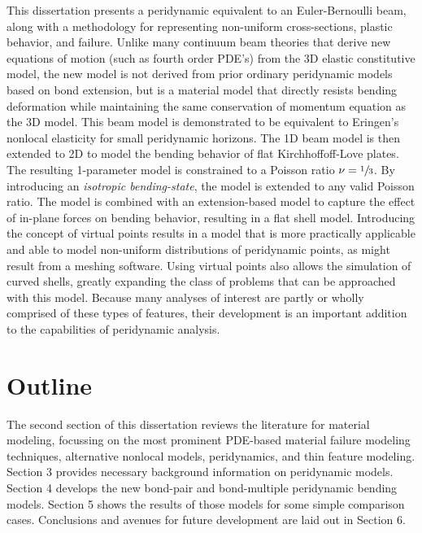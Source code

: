 This dissertation presents a peridynamic equivalent to an Euler-Bernoulli beam, along with a methodology for representing non-uniform cross-sections, plastic behavior, and failure.
Unlike many continuum beam theories that derive new equations of motion (such as fourth order PDE's) from the 3D elastic constitutive model, the new model is not derived from prior ordinary peridynamic models based on bond extension, but is a material model that directly resists bending deformation while maintaining the same conservation of momentum equation as the 3D model.
This beam model is demonstrated to be equivalent to Eringen's nonlocal elasticity for small peridynamic horizons.
The 1D beam model is then extended to 2D to model the bending behavior of flat Kirchhoffoff-Love plates.
The resulting 1-parameter model is constrained to a Poisson ratio \(\nu=\sfrac{1}{3}\).  
By introducing an \emph{isotropic bending-state}, the model is extended to any valid Poisson ratio.  
The model is combined with an extension-based model to capture the effect of in-plane forces on bending behavior, resulting in a flat shell model.
Introducing the concept of virtual points results in a model that is more practically applicable and able to model non-uniform distributions of peridynamic points, as might result from a meshing software.
Using virtual points also allows the simulation of curved shells, greatly expanding the class of problems that can be approached with this model.
Because many analyses of interest are partly or wholly comprised of these types of features, their development is an important addition to the capabilities of peridynamic analysis.

\section{Outline}

The second section of this dissertation reviews the literature for material modeling, focussing on the most prominent PDE-based material failure modeling techniques, alternative nonlocal models, peridynamics, and thin feature modeling. Section 3 provides necessary background information on peridynamic models. Section 4 develops the new bond-pair and bond-multiple peridynamic bending models. Section 5 shows the results of those models for some simple comparison cases. Conclusions and avenues for future development are laid out in Section 6.
